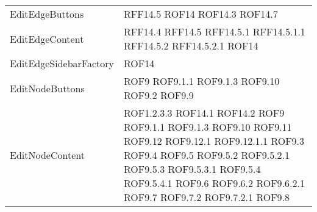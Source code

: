 \begin{longtable}{p{5cm}!{\VRule[1pt]}p{2.5cm}}
		EditEdgeButtons & RFF14.5 \newline ROF14 \newline ROF14.3 \newline ROF14.7\\
		EditEdgeContent & RFF14.4 \newline RFF14.5 \newline RFF14.5.1 \newline RFF14.5.1.1 \newline RFF14.5.2 \newline RFF14.5.2.1 \newline ROF14\\
		EditEdgeSidebarFactory & ROF14\\
		EditNodeButtons & ROF9 \newline ROF9.1.1 \newline ROF9.1.3 \newline ROF9.10 \newline ROF9.2 \newline ROF9.9\\
		EditNodeContent & ROF1.2.3.3 \newline ROF14.1 \newline ROF14.2 \newline ROF9 \newline ROF9.1.1 \newline ROF9.1.3 \newline ROF9.10 \newline ROF9.11 \newline ROF9.12 \newline ROF9.12.1 \newline ROF9.12.1.1 \newline ROF9.3 \newline ROF9.4 \newline ROF9.5 \newline ROF9.5.2 \newline ROF9.5.2.1 \newline ROF9.5.3 \newline ROF9.5.3.1 \newline ROF9.5.4 \newline ROF9.5.4.1 \newline ROF9.6 \newline ROF9.6.2 \newline ROF9.6.2.1 \newline ROF9.7 \newline ROF9.7.2 \newline ROF9.7.2.1 \newline ROF9.8\\

\end{longtable}

